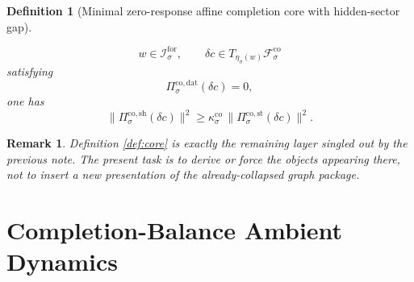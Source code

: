 \documentclass[11pt]{article}
\newcommand{\ForSpace}[1]{\mathcal I_{#1}^{\mathrm{for}}}
\newcommand{\CoreAffine}[1]{\mathcal F_{#1}^{\mathrm{co}}}
\newcommand{\CoreStateProj}[1]{\Pi_{#1}^{\mathrm{co,st}}}
\newcommand{\CoreDataProj}[1]{\Pi_{#1}^{\mathrm{co,dat}}}
\newcommand{\CoreShellProj}[1]{\Pi_{#1}^{\mathrm{co,sh}}}
\newcommand{\CoreEmbed}[1]{\eta_{#1}}
\newtheorem{definition}{Definition}
\newtheorem{remark}{Remark}
\begin{document}
\begin{definition}[Minimal zero-response affine completion core with hidden-sector gap]
\begin{enumerate}
    \[
    w\in\ForSpace{\sigma},
    \qquad
    \delta c\in T_{\CoreEmbed{\sigma}(w)}\CoreAffine{\sigma}
    \]
    satisfying
    \[
    \CoreDataProj{\sigma}(\delta c)=0,
    \]
    one has
    \begin{equation}
    \bigl\|
    \CoreShellProj{\sigma}(\delta c)
    \bigr\|^{2}
    \ge
    \kappa_{\sigma}^{\mathrm{co}}\,
    \bigl\|
    \CoreStateProj{\sigma}(\delta c)
    \bigr\|^{2}.
    \label{eq:corecoercive}
    \end{equation}
\end{enumerate}
\end{definition}

\begin{remark}
Definition \ref{def:core} is exactly the remaining layer singled out by the previous note. The present task is to derive or force the objects appearing there, not to insert a new presentation of the already-collapsed graph package.
\end{remark}

\section{Completion-Balance Ambient Dynamics}
\end{document}
